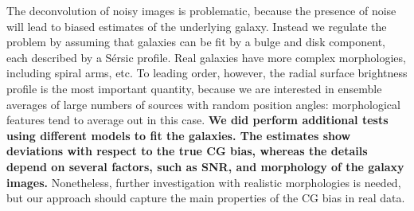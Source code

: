 \documentclass[useAMS,usenatbib]{mnras}
\begin{document}
%
The deconvolution of noisy images is problematic, because the presence of noise will lead to biased estimates of the underlying galaxy. Instead we regulate the problem by assuming that galaxies can be fit by a bulge and disk component, each described by a S{\'e}rsic profile. Real galaxies have more complex morphologies, including spiral arms, etc. To leading order, however, the radial surface brightness profile is the most important quantity, because we are interested in ensemble averages of large numbers of sources with random position angles: morphological features tend to average out in this case. {\bf We did perform additional tests using different models to fit the galaxies. The estimates show deviations with respect to the true CG bias, whereas the details depend on several factors, such as SNR, and morphology of the galaxy images.} Nonetheless, further investigation with realistic morphologies is needed, but our approach should capture the main properties of the CG bias in real data.
\end{document}

